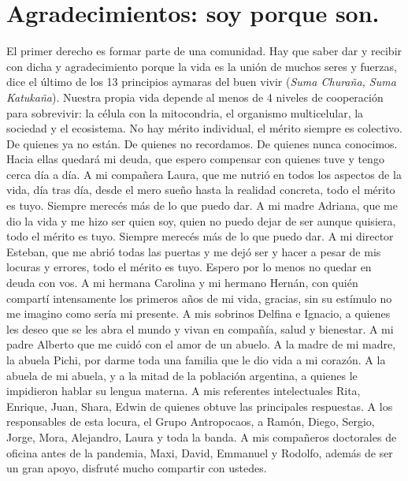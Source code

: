 \documentclass[a4paper,11pt]{book}
\theoremstyle{definition}
\begin{document}
\vfill


\normalsize

\chapter*{Agradecimientos: soy porque son.}

El primer derecho es formar parte de una comunidad.
%
Hay que saber dar y recibir con dicha y agradecimiento porque la vida es la uni\'on de muchos seres y fuerzas, dice el \'ultimo de los 13 principios aymaras del buen vivir (\emph{Suma Chura\~na, Suma Katuka\~na}).
%
Nuestra propia vida depende al menos de 4 niveles de cooperaci\'on para sobrevivir: la c\'elula con la mitocondria, el organismo multicelular, la sociedad y el ecosistema.
%
No hay m\'erito individual, el m\'erito siempre es colectivo.
%
De quienes ya no est\'an.
%
De quienes no recordamos.
%
De quienes nunca conocimos.
%
Hacia ellas quedar\'a mi deuda, que espero compensar con quienes tuve y tengo cerca d\'ia a d\'ia.
%
A mi compa\~nera Laura, que me nutri\'o en todos los aspectos de la vida, d\'ia tras d\'ia, desde el mero sue\~no hasta la realidad concreta, todo el m\'erito es tuyo. Siempre merec\'es m\'as de lo que puedo dar.
%
A mi madre Adriana, que me dio la vida y me hizo ser quien soy, quien no puedo dejar de ser aunque quisiera, todo el m\'erito es tuyo. Siempre merec\'es m\'as de lo que puedo dar.
%
A mi director Esteban, que me abri\'o todas las puertas y me dej\'o ser y hacer a pesar de mis locuras y errores, todo el m\'erito es tuyo. Espero por lo menos no quedar en deuda con vos.
%
A mi hermana Carolina y mi hermano Hern\'an, con qui\'en compart\'i intensamente los primeros a\~nos de mi vida, gracias, sin su est\'imulo no me imagino como ser\'ia mi presente.
%
A mis sobrinos Delfina e Ignacio, a quienes les deseo que se les abra el mundo y vivan en compa\~n\'ia, salud y bienestar.
%
A mi padre Alberto que me cuid\'o con el amor de un abuelo.
%
A la madre de mi madre, la abuela Pichi, por darme toda una familia que le dio vida a mi coraz\'on.
%
A la abuela de mi abuela, y a la mitad de la poblaci\'on argentina, a quienes le impidieron hablar su lengua materna.
%
A mis referentes intelectuales Rita, Enrique, Juan, Shara, Edwin de quienes obtuve las principales respuestas.
%
A los responsables de esta locura, el Grupo Antropocaos, a Ram\'on, Diego, Sergio, Jorge, Mora, Alejandro, Laura y toda la banda.
%
A mis compa\~neros doctorales de oficina antes de la pandemia, Maxi, David, Emmanuel y Rodolfo, adem\'as de ser un gran apoyo, disfrut\'e mucho compartir con ustedes.
\end{document}
